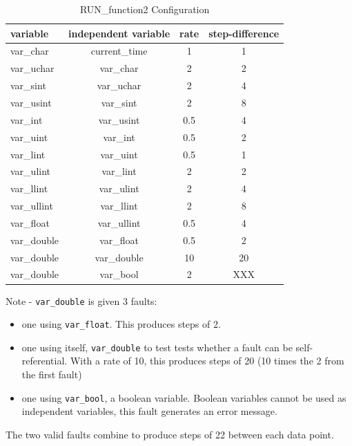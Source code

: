 \documentclass[11pt,fleqn]{report}
\begin{document}
\begin{table}[ht]
\centering
\caption{RUN\_function2 Configuration} \label{tbl:function2}
\begin{tabular}{|l|c|c|c|} \hline
\textbf{variable} & \textbf{independent variable} & \textbf{rate} &
\textbf{step-difference} \\ \hline
var\_char & current\_time & 1 & 1 \\ \hline
var\_uchar & var\_char & 2 & 2 \\ \hline
var\_sint & var\_uchar & 2 & 4 \\ \hline
var\_usint & var\_sint & 2 & 8 \\ \hline
var\_int & var\_usint & 0.5 & 4 \\ \hline
var\_uint & var\_int & 0.5 & 2 \\ \hline
var\_lint & var\_uint & 0.5 & 1 \\ \hline
var\_ulint & var\_lint & 2 & 2 \\ \hline
var\_llint & var\_ulint & 2 & 4 \\ \hline
var\_ullint & var\_llint & 2 & 8 \\ \hline
var\_float & var\_ullint & 0.5 & 4 \\ \hline
var\_double & var\_float & 0.5 & 2 \\ \hline
var\_double & var\_double & 10 & 20 \\ \hline
var\_double & var\_bool & 2 & XXX \\ \hline
\end{tabular}
\end{table}
Note - \verb'var_double' is given 3 faults:
\begin {itemize}
 \item one using \verb'var_float'. This produces steps of 2.
 \item one using itself, \verb'var_double' to test tests whether a fault can be
       self- referential. With a rate of 10, this produces steps of 20 (10 times
       the 2 from the first fault)
 \item one using \verb'var_bool', a boolean variable. Boolean variables cannot be
       used as independent variables, this fault generates an error message.
\end {itemize}
The two valid faults combine to produce steps of 22 between each data point.
\end{document}
